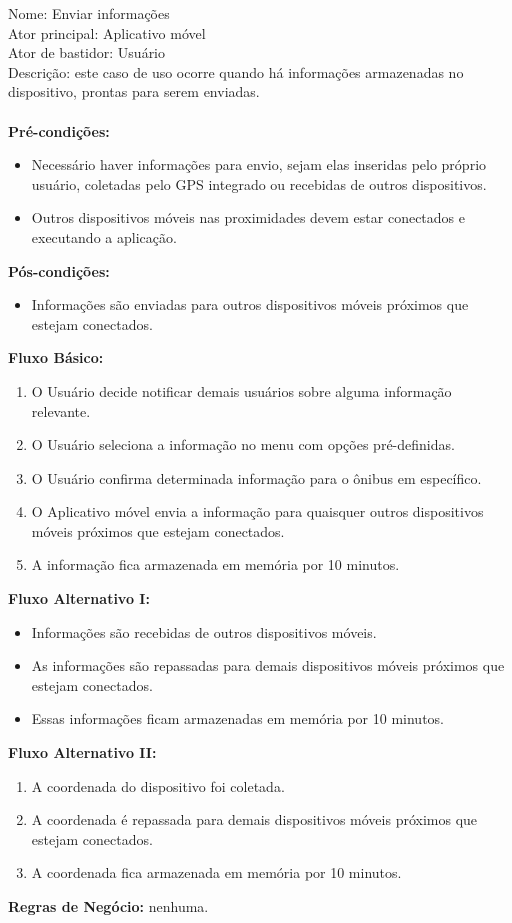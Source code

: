 \noindent Nome: Enviar informações\\
Ator principal:	Aplicativo móvel\\
Ator de bastidor: Usuário\\
Descrição: este caso de uso ocorre quando há informações armazenadas no dispositivo, prontas para serem enviadas.\\\\
\textbf{Pré-condições:}
	\begin{itemize}
		\item Necessário haver informações para envio, sejam elas inseridas pelo próprio usuário, coletadas pelo GPS integrado ou recebidas de outros dispositivos. 
		\item Outros dispositivos móveis nas proximidades devem estar conectados e executando a aplicação.
	\end{itemize}
\textbf{Pós-condições:}
	\begin{itemize}
		\item Informações são enviadas para outros dispositivos móveis próximos que estejam conectados.
	\end{itemize}	
\textbf{Fluxo Básico:}
	\begin{enumerate}
		\item O Usuário decide notificar demais usuários sobre alguma informação relevante.
		\item O Usuário seleciona a informação no menu com opções pré-definidas.
		\item O Usuário confirma determinada informação para o ônibus em específico.
		\item O Aplicativo móvel envia a informação para quaisquer outros dispositivos móveis próximos que estejam conectados.
		\item A informação fica armazenada em memória por 10 minutos.
	\end{enumerate}	
\textbf{Fluxo Alternativo I:}
	\begin{itemize}
		\item Informações são recebidas de outros dispositivos móveis.
		\item As informações são repassadas para demais dispositivos móveis próximos que estejam conectados.
		\item Essas informações ficam armazenadas em memória por 10 minutos.
	\end{itemize}
\textbf{Fluxo Alternativo II:}
	\begin{enumerate}
		\item A coordenada do dispositivo foi coletada.
		\item A coordenada é repassada para demais dispositivos móveis próximos que estejam conectados.
		\item A coordenada fica armazenada em memória por 10 minutos.
	\end{enumerate}
\textbf{Regras de Negócio:}	nenhuma.

